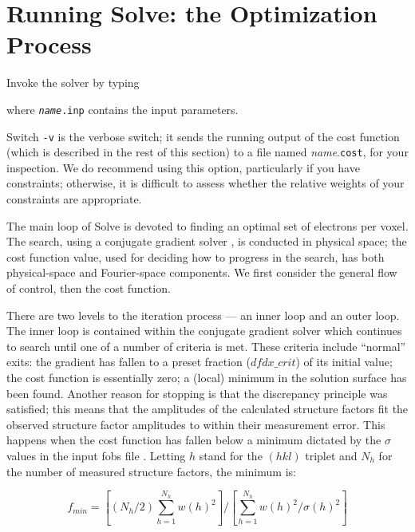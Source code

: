 \documentclass{report}
\begin{document}
\section {Running Solve: the Optimization Process}
\label{solver-running}

Invoke the solver by typing


where {\tt {\it name}.inp} contains the input parameters.  

\vspace {0.1in}

Switch {\tt -v} is the 
verbose switch; it sends the running output of the cost function 
(which is described in the rest of this section)
to a file named {\it name}.{\tt cost}, for your inspection.  
We do recommend using this option, particularly if you have constraints;
otherwise, it is difficult to assess whether the relative weights of your
constraints are appropriate. 

\vspace {0.1in}

The main loop of Solve is devoted to finding an optimal set of electrons per
voxel.  The search, using a conjugate gradient solver \cite{getsol}, is 
conducted in physical space; the cost function value,
used for deciding how to progress in the search, has both 
physical-space and Fourier-space components.
We first consider the general flow of control, then the cost function.

\vspace {0.1in}

There are two levels to the iteration process --- an inner loop and an
outer loop.  The inner loop is contained 
within the conjugate gradient solver which continues to search until one of a
number of criteria is met.  These criteria include ``normal'' exits: 
the gradient has fallen to a preset fraction ($dfdx\_crit$) of its
initial value; the cost function 
is essentially zero; a (local) minimum in the solution surface has been found.
Another reason for stopping is that the discrepancy principle was satisfied;
this means that the amplitudes of the calculated structure factors
fit the observed structure factor amplitudes to within their measurement
error.  This happens when the cost function
has fallen below a minimum dictated by the $\sigma$ values 
in the input fobs file \cite{eden6}.   Letting $h$ stand for the $(hkl)$
triplet and $N_h$ for the number of measured structure factors, the minimum is:

$$    f_{min} = \left[ (N_h / 2) \sum_{h=1}^{N_h} w(h)^2 \right] / 
                     \left[ \sum_{h=1}^{N_h} w(h)^2 / \sigma(h)^2 \right] $$
\end{document}
